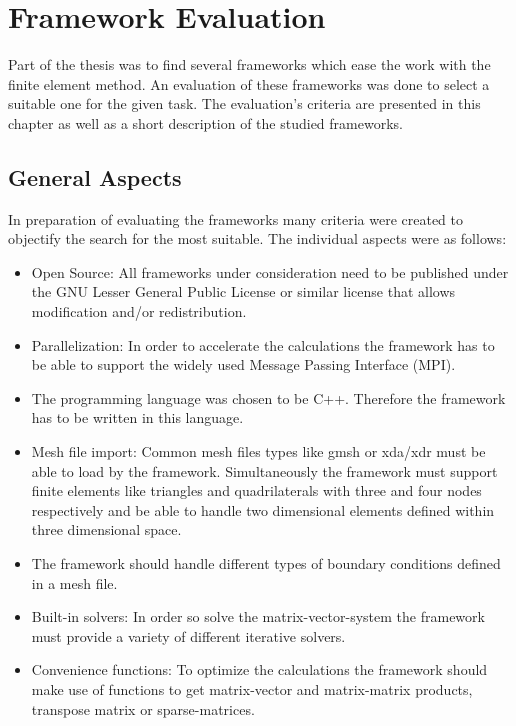\section{Framework Evaluation}
Part of the thesis was to find several frameworks which ease the work with the finite element method. An evaluation of these frameworks was done to select a suitable one for the given task. The evaluation's criteria are presented in this chapter as well as a short description of the studied frameworks.
 \subsection{General Aspects}
In preparation of evaluating the frameworks many criteria were created to objectify the search for the most suitable. The individual aspects were as follows:
 \begin{itemize}
 \item Open Source: All frameworks under consideration need to be published under the GNU Lesser General Public License or similar license that allows modification and/or redistribution.
 \item Parallelization: In order to accelerate the calculations the framework has to be able to support the widely used Message Passing Interface (MPI).
 \item The programming language was chosen to be C++. Therefore the framework has to be written in this language. %
 \item Mesh file import: Common mesh files types like gmsh or xda/xdr must be able to load by the framework. Simultaneously the framework must support finite elements like triangles and quadrilaterals with three and four nodes respectively and be able to handle two dimensional elements defined within three dimensional space. %
 \item The framework should handle different types of boundary conditions defined in a mesh file. %
 \item Built-in solvers: In order so solve the matrix-vector-system the framework must provide a variety of different iterative solvers. %
 \item Convenience functions: To optimize the calculations the framework should make use of functions to get matrix-vector and matrix-matrix products, transpose matrix or sparse-matrices.

\end{itemize}
